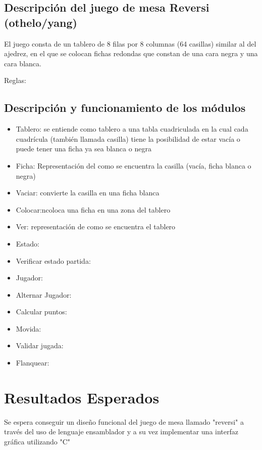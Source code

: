 \documentclass[conference]{IEEEtran}
\begin{document}
\subsection{Descripción del juego de mesa Reversi (othelo/yang)}

El juego consta de un tablero de 8 filas por 8 columnas (64 casillas) similar al del ajedrez, 
en el que se colocan fichas redondas que constan de una cara negra y una cara blanca.

Reglas:



\subsection{Descripción y funcionamiento de los módulos}

\begin{itemize}
    \item Tablero: se entiende como tablero a una tabla cuadriculada en la cual cada cuadrícula (también llamada casilla) tiene la posibilidad de estar vacía o puede tener una ficha ya sea blanca o negra
    \item Ficha: Representación del como se encuentra la casilla (vacía, ficha blanca o negra)
    \item Vaciar: convierte la casilla en una ficha blanca
    \item Colocar:ncoloca una ficha en una zona del tablero
    \item Ver: representación de como se encuentra el tablero
    \item Estado:
    \item Verificar estado partida:
    \item Jugador:
    \item Alternar Jugador:
    \item Calcular puntos:
    \item Movida:
    \item Validar jugada:
    \item Flanquear:
\end{itemize}

\section{Resultados Esperados}
Se espera conseguir un diseño funcional del juego de mesa llamado "reversi" a través del uso de lenguaje ensamblador y a su vez implementar una interfaz gráfica utilizando "C"
\end{document}

